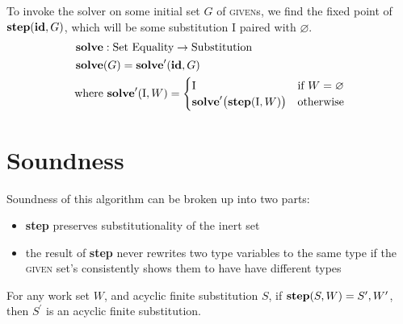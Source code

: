 \documentclass[10pt, letterpaper, oneside]{article}
\newcommand{\inertset}{\text{I}}
\begin{document}
To invoke the solver on some initial set \(G\) of \textsc{given}s, we find the fixed point of \(\text{\bf step}(\text{\bf id}, G)\), which will be some substitution \(\inertset\) paired with \(\varnothing\).
\begin{align*}
  \text{\bf solve} &: \text{Set}~\text{Equality} \to \text{Substitution}\\
  \text{\bf solve}&(G) = \text{\bf solve}^\prime(\text{\bf id}, G)\\
  \text{where}&~\text{\bf solve}^\prime(\inertset, W) =
    \begin{cases}
      \inertset & \text{if } W = \varnothing\\
      \text{\bf solve}^\prime\big(\text{\bf step}(\inertset, W)\big) & \text{otherwise}
    \end{cases}
\end{align*}

\section{Soundness}

Soundness of this algorithm can be broken up into two parts:

\begin{itemize}
\item \textbf{step} preserves substitutionality of the inert set
\item the result of \textbf{step} never rewrites two type variables to the same type if the \textsc{given} set's  consistently shows them to have have different types
\end{itemize}

\begin{lemma}
  \label{lemma:step-preserves-substitutionality}
  For any work set \(W\), and acyclic finite substitution \(S\), if \(\text{\bf step}(S, W) = S^\prime, W^\prime\), then \(S^\prime\) is an acyclic finite substitution.
\end{lemma}
\end{document}
